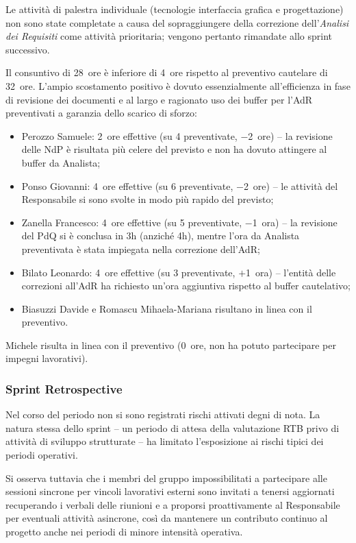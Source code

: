 \documentclass[a4paper, 11pt, oneside]{scrartcl} %
\begin{document}
Le attività di palestra individuale (tecnologie interfaccia grafica e progettazione) non sono state completate a causa del sopraggiungere della correzione dell'\textit{Analisi dei Requisiti} come attività prioritaria; vengono pertanto rimandate allo sprint successivo.

Il consuntivo di 28~ore è inferiore di 4~ore rispetto al preventivo cautelare di 32~ore.
L'ampio scostamento positivo è dovuto essenzialmente all'efficienza in fase di revisione dei documenti e al largo e ragionato uso dei buffer per l'AdR preventivati a garanzia dello scarico di sforzo:
\begin{itemize}[noitemsep, topsep=2pt]
  \item Perozzo Samuele: 2~ore effettive (su 4 preventivate, $-$2~ore) -- la revisione delle NdP è risultata più celere del previsto e non ha dovuto attingere al buffer da Analista;
  \item Ponso Giovanni: 4~ore effettive (su 6 preventivate, $-$2~ore) -- le attività del Responsabile si sono svolte in modo più rapido del previsto;
  \item Zanella Francesco: 4~ore effettive (su 5 preventivate, $-$1~ora) -- la revisione del PdQ si è conclusa in 3h (anziché 4h), mentre l'ora da Analista preventivata è stata impiegata nella correzione dell'AdR;
  \item Bilato Leonardo: 4~ore effettive (su 3 preventivate, $+$1~ora) -- l'entità delle correzioni all'AdR ha richiesto un'ora aggiuntiva rispetto al buffer cautelativo;
  \item Biasuzzi Davide e Romascu Mihaela-Mariana risultano in linea con il preventivo.
\end{itemize}
Michele risulta in linea con il preventivo (0~ore, non ha potuto partecipare per impegni lavorativi).

\subsubsection*{Sprint Retrospective}

Nel corso del periodo non si sono registrati rischi attivati degni di nota. La natura stessa dello sprint -- un periodo di attesa della valutazione RTB privo di attività di sviluppo strutturate -- ha limitato l'esposizione ai rischi tipici dei periodi operativi.

Si osserva tuttavia che i membri del gruppo impossibilitati a partecipare alle sessioni sincrone per vincoli lavorativi esterni sono invitati a tenersi aggiornati recuperando i verbali delle riunioni e a proporsi proattivamente al Responsabile per eventuali attività asincrone, così da mantenere un contributo continuo al progetto anche nei periodi di minore intensità operativa.
\end{document}
